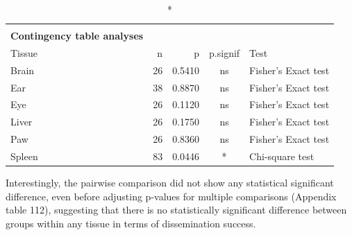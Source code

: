 \documentclass[
  12pt,
  letterpaper,
]{article}
\begin{document}
\begingroup
\fontsize{12.0pt}{14.4pt}\selectfont
\begin{longtable}{l|rrcl}
\caption*{
{\large \textbf{Appendix Table 111}} \\ 
{\small \textbf{Contingency table analyses}}
} \\ 
\toprule
Tissue & {n} & {p} & {p.signif} & {Test} \\ 
\midrule\addlinespace[2.5pt]
Brain & 26 & 0.5410 & ns & Fisher's Exact test \\ 
Ear & 38 & 0.8870 & ns & Fisher's Exact test \\ 
Eye & 26 & 0.1120 & ns & Fisher's Exact test \\ 
Liver & 26 & 0.1750 & ns & Fisher's Exact test \\ 
Paw & 26 & 0.8360 & ns & Fisher's Exact test \\ 
Spleen & 83 & 0.0446 & * & Chi-square test \\ 
\bottomrule
\end{longtable}
\endgroup

Interestingly, the pairwise comparison did not show any statistical significant difference, even before adjusting p-values for multiple comparisons (Appendix table 112), suggesting that there is no statistically significant difference between groups within any tissue in terms of dissemination success.
\end{document}
